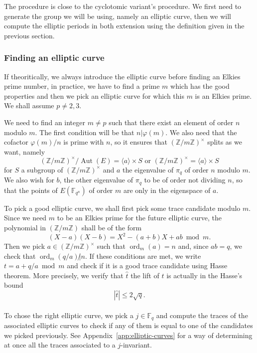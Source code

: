 \documentclass[12pt]{article}
\theoremstyle{plain}
\theoremstyle{definition}
\DeclareMathOperator{\order}{ord} %
\DeclareMathOperator{\Aut}{Aut}
\def\Z{\ensuremath{\mathbb{Z}}}
\def\F{\ensuremath{\mathbb{F}}}
\begin{document}
The procedure is close to the cyclotomic variant's procedure. We first need to
generate the group we will be using, namely an elliptic curve, then we will
compute the elliptic periods in both extension using the definition given in the
previous section.

\subsubsection{Finding an elliptic curve}
If theoritically, we always introduce the elliptic curve before finding an
Elkies prime number, in practice, we have to find a prime $m$ which has the good
properties and then we pick an elliptic curve for which this $m$ is an Elkies
prime. We shall assume $p\neq2,3$.

We need to find an integer $m\neq p$ such that there exist an element of order $n$
modulo $m$. The first condition will be that $n|\varphi(m)$. We also need 
that the cofactor $\varphi(m)/n$ is prime with $n$, so it ensures that 
$(\Z/m\Z)^{\times}$ splits as we want, namely 
\begin{equation}
(\Z/m\Z)^{\times}/\Aut(E)=\langle{a}\rangle\times S \text{ or } 
(\Z/m\Z)^{\times}=\langle{a}\rangle\times S
\end{equation}
for $S$ a subgroup of $(\Z/m\Z)^{\times}$ and $a$ the eigenvalue of $\pi_q$ of
order $n$ modulo $m$. We also wish for $b$, the other eigenvalue of $\pi_q$ to
be of order not dividing $n$, so that the points of $E(\F_{q^n})$ of order $m$
are only in the eigenspace of $a$.

To pick a good elliptic curve, we shall first pick some trace candidate modulo 
$m$. Since we need $m$ to be an Elkies prime for the future elliptic curve, the
polynomial in $(\Z/m\Z)$ shall be of the form
\begin{equation}
(X - a)(X - b) = X^2 - (a + b)X + ab \bmod m.
\end{equation}
Then we pick $a\in(\Z/m\Z)^{\times}$ such that $\order_m(a) = n$ and,
since $ab = q$, we check that $\order_m(q/a)\not| n$. If these conditions are
met, we write $t = a + q/a \bmod m$ and check if it is a good trace candidate
using Hasse theorem. More precisely, we verify that $\widehat{t}$ the lift of $t$ is
actually in the Hasse's bound
\begin{equation}
|\widehat{t}| \leq 2\sqrt{q}.
\end{equation}\\

To chose the right elliptic curve, we pick a $j\in\F_q$ and compute
the traces of the associated elliptic curves to check if any of them
is equal to one of the candidates we picked previously. See
Appendix~\ref{app:elliptic-curves} for a way of determining at once
all the traces associated to a $j$-invariant.
\end{document}
